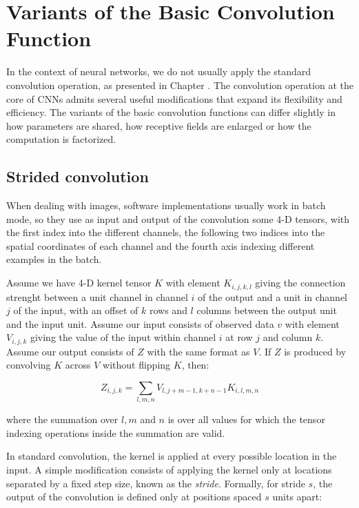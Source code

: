 \chapter{Variants of the Basic Convolution Function}

In the context of neural networks, we do not usually apply the standard convolution operation, as presented in Chapter . The convolution operation at the core of CNNs admits several useful modifications that expand its flexibility and efficiency.  
The variants of the basic convolution functions can differ slightly in how parameters are shared, how receptive fields are enlarged or how the computation is factorized.  

\section{Strided convolution}

When dealing with images, software implementations usually work in batch mode, so they use as input and output of the convolution some 4-D tensors, with the first index into the diﬀerent channels, the following two indices into the spatial coordinates of each channel and the fourth axis indexing diﬀerent examples in the batch. 

Assume we have 4-D kernel tensor $K$ with element $K_{i,j,k,l}$ giving the connection strenght between a unit channel in channel $i$ of the output and a unit in channel $j$ of the input, with an offset of $k$ rows and $l$ columns between the output unit and the input unit. Assume our input consists of observed data $v$ with element $V_{i,j,k}$ giving the value of the input within channel $i$ at row $j$ and column $k$. Assume our output consists of $Z$ with the same format as $V$. If $Z$ is produced by convolving $K$ across $V$ without flipping $K$, then:

\begin{equation}
    Z_{i,j,k}=\sum_{l,m,n}V_{l,j+m-1,k+n-1}K_{i,l,m,n}
\end{equation}

where the summation over $l, m$ and $n$ is over all values for which the tensor indexing operations inside the summation are valid.

In standard convolution, the kernel is applied at every possible location in the input. A simple modification consists of applying the kernel only at locations separated by a fixed step size, known as the \textit{stride}. Formally, for stride $s$, the output of the convolution is defined only at positions spaced $s$ units apart:

